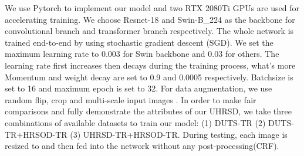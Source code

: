 \documentclass[10pt,twocolumn,letterpaper]{article}
\begin{document}
We use Pytorch\cite{paszke2017automatic} to implement our model and two RTX 2080Ti GPUs are used for accelerating training. We choose Resnet-18 \cite{he2016deep} and Swin-B\_224 \cite{liu2021swin} as the backbone for convolutional branch and transformer branch respectively. 
The whole network is trained end-to-end by using stochastic gradient descent (SGD). We set the maximum learning rate to 0.003 for Swin backbone and 0.03 for others. The learning rate first increases then decays during the training process, what's more Momentum and weight decay are set to 0.9 and 0.0005 respectively. Batchsize is set to 16 and maximum epoch is set to 32. For data augmentation, we use random flip, crop and multi-scale input images \cite{tang2021disentangled,qin2019basnet,zhao2019egnet}. In order to make fair comparisons and fully demonstrate the attributes of our UHRSD, we take three combinations of available datasets to train our model: (1) DUTS-TR (2) DUTS-TR+HRSOD-TR (3) UHRSD-TR+HRSOD-TR.
During testing, each image is resized to  and then fed into the network without any post-processing(\eg CRF\cite{krahenbuhl2011efficient}).


\begin{table}[]
\caption{Comparison of different architectures and compositions.}

\renewcommand\arraystretch{1}
\label{table:ablation1}
\centering
{}
\end{table}
\end{document}
